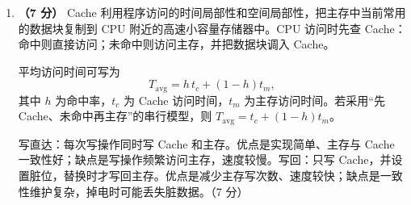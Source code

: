 \documentclass[a4paper,11pt]{article}
\begin{document}
\begin{enumerate}[start=1, label=\textbf{\arabic*.}, leftmargin=2.4em, itemsep=0.45em]
\item \textbf{（7 分）}
Cache 利用程序访问的时间局部性和空间局部性，把主存中当前常用的数据块复制到 CPU 附近的高速小容量存储器中。CPU 访问时先查 Cache：命中则直接访问；未命中则访问主存，并把数据块调入 Cache。

平均访问时间可写为
\[
T_{\text{avg}}=h\,t_c+(1-h)t_m,
\]
其中 $h$ 为命中率，$t_c$ 为 Cache 访问时间，$t_m$ 为主存访问时间。若采用“先 Cache、未命中再主存”的串行模型，则 $T_{\text{avg}}=t_c+(1-h)t_m$。

写直达：每次写操作同时写 Cache 和主存。优点是实现简单、主存与 Cache 一致性好；缺点是写操作频繁访问主存，速度较慢。写回：只写 Cache，并设置脏位，替换时才写回主存。优点是减少主存写次数、速度较快；缺点是一致性维护复杂，掉电时可能丢失脏数据。\hfill（7 分）

\end{enumerate}

\end{document}

